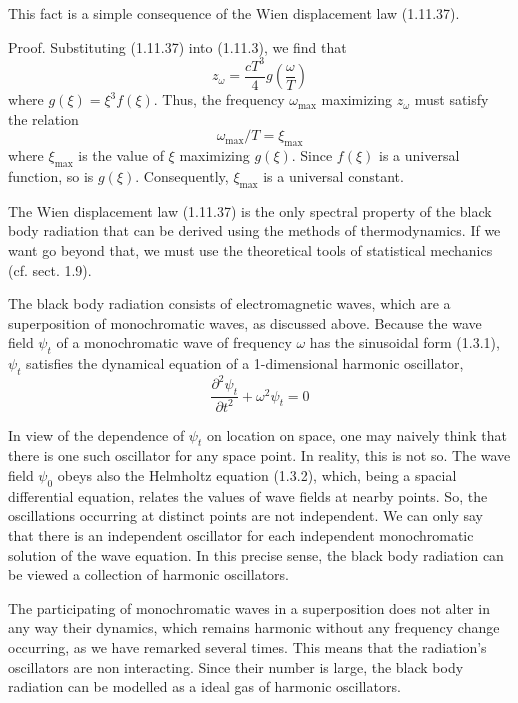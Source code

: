 \documentclass{article}
\begin{document}
This fact is a simple consequence of the Wien displacement law (1.11.37).

Proof. Substituting (1.11.37) into (1.11.3), we find that
$$
\begin{equation*}
z_{\omega}=\frac{c T^{3}}{4} g\left(\frac{\omega}{T}\right) \tag{1.11.57}
\end{equation*}
$$
where $g(\xi)=\xi^{3} f(\xi)$. Thus, the frequency $\omega_{\max }$ maximizing $z_{\omega}$ must satisfy the relation
$$
\begin{equation*}
\omega_{\max } / T=\xi_{\max } \tag{1.11.58}
\end{equation*}
$$
where $\xi_{\max }$ is the value of $\xi$ maximizing $g(\xi)$. Since $f(\xi)$ is a universal function, so is $g(\xi)$. Consequently, $\xi_{\max }$ is a universal constant.

The Wien displacement law (1.11.37) is the only spectral property of the black body radiation that can be derived using the methods of thermodynamics. If we want go beyond that, we must use the theoretical tools of statistical mechanics (cf. sect. 1.9).

The black body radiation consists of electromagnetic waves, which are a superposition of monochromatic waves, as discussed above. Because the wave field $\psi_{t}$ of a monochromatic wave of frequency $\omega$ has the sinusoidal form (1.3.1), $\psi_{t}$ satisfies the dynamical equation of a 1-dimensional harmonic oscillator,
$$
\begin{equation*}
\frac{\partial^{2} \psi_{t}}{\partial t^{2}}+\omega^{2} \psi_{t}=0 \tag{1.11.59}
\end{equation*}
$$

In view of the dependence of $\psi_{t}$ on location on space, one may naively think that there is one such oscillator for any space point. In reality, this is not so. The wave field $\psi_{0}$ obeys also the Helmholtz equation (1.3.2), which, being a spacial differential equation, relates the values of wave fields at nearby points. So, the oscillations occurring at distinct points are not independent. We can only say that there is an independent oscillator for each independent monochromatic solution of the wave equation. In this precise sense, the black body radiation can be viewed a collection of harmonic oscillators.

The participating of monochromatic waves in a superposition does not alter in any way their dynamics, which remains harmonic without any frequency change occurring, as we have remarked several times. This means that the radiation's oscillators are non interacting. Since their number is large, the black body radiation can be modelled as a ideal gas of harmonic oscillators.
\end{document}
